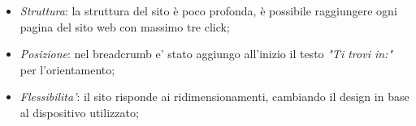 \begin{itemize}
	\item \textit{Struttura}: la struttura del sito è poco profonda, è possibile raggiungere ogni pagina
	del sito web con massimo tre click;
	\item \textit{Posizione}: nel breadcrumb e' stato aggiungo all'inizio il testo \textit{"Ti trovi in:"} per l'orientamento;
	\item \textit{Flessibilita'}: il sito risponde ai ridimensionamenti, cambiando il design in base al dispositivo utilizzato;
\end{itemize}

	


